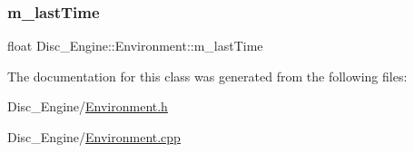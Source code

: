 \subsubsection{\texorpdfstring{m\+\_\+last\+Time}{m\_lastTime}}
{\footnotesize\ttfamily float Disc\+\_\+\+Engine\+::\+Environment\+::m\+\_\+last\+Time\hspace{0.3cm}{\ttfamily [private]}}



The documentation for this class was generated from the following files\+:\begin{DoxyCompactItemize}
\item 
Disc\+\_\+\+Engine/\mbox{\hyperlink{_environment_8h}{Environment.\+h}}\item 
Disc\+\_\+\+Engine/\mbox{\hyperlink{_environment_8cpp}{Environment.\+cpp}}\end{DoxyCompactItemize}

